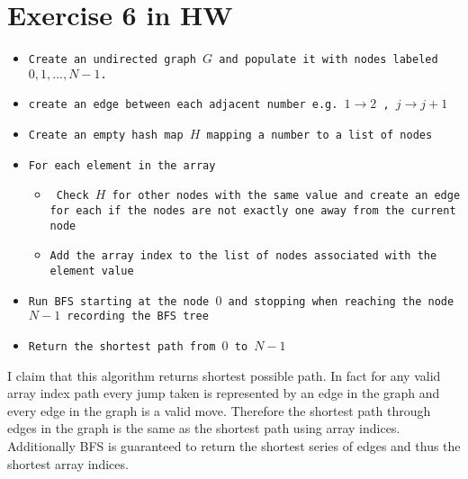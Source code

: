 \documentclass{amsart}
\begin{document}
\section{Exercise 6 in HW}
{\small
    \begin{itemize}
        \item \texttt{Create an undirected graph $G$ and populate it with nodes labeled $0, 1, ..., N-1$.}
        \item \texttt{create an edge between each adjacent number e.g. $1 \rightarrow 2$ , $j \rightarrow j+1$}
        \item \texttt{Create an empty hash map  $H$ mapping a number to a list of nodes}
        \item \texttt{For each element in the array}
            \begin{itemize}
                \item \texttt{ Check $H$ for other nodes with the same value and create an edge for each if the nodes are not exactly one away from the current node}
                \item \texttt{Add the array index to the list of nodes associated with the element value}
            \end{itemize}
        \item \texttt{Run BFS starting at the node $0$ and stopping when reaching the node $N-1$ recording the BFS tree}
        \item \texttt{Return the shortest path from $0$ to $N-1$}
    \end{itemize}
}
I claim that this algorithm returns shortest possible path. In fact for any valid array index path every jump taken is represented by an edge in the graph and every edge in the graph is a valid move.
Therefore the shortest path through edges in the graph is the same as the shortest path using array indices.
Additionally BFS is guaranteed to return the shortest series of edges and thus the shortest array indices.
\end{document}
